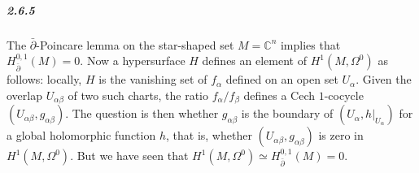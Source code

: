 \documentclass[10pt,letter]{article}
\begin{document}
\subparagraph{2.6.5} The $\bar{\partial}$-Poincare lemma on the star-shaped set $M = \mathbb{C}^n$ implies that $H^{0,1}_{\bar{\partial}}(M) = 0$. Now a hypersurface $H$ defines an element of $H^1(M,\Omega^0)$ as follows: locally, $H$ is the vanishing set of $f_{\alpha}$ defined on an open set $U_{\alpha}$. Given the overlap $U_{\alpha \beta}$ of two such charts, the ratio $f_{\alpha}/f_{\beta}$ defines a Cech $1$-cocycle $(U_{\alpha \beta}, g_{\alpha \beta})$.  The question is then whether $g_{\alpha \beta}$ is the boundary of $(U_{\alpha},h\vert_{U_{\alpha}})$ for a global holomorphic function $h$, that is, whether $(U_{\alpha \beta}, g_{\alpha \beta})$ is zero in $H^1(M,\Omega^0)$. But we have seen that $H^1(M,\Omega^0) \simeq H^{0,1}_{\bar{\partial}}(M) = 0$. 
\end{document}
